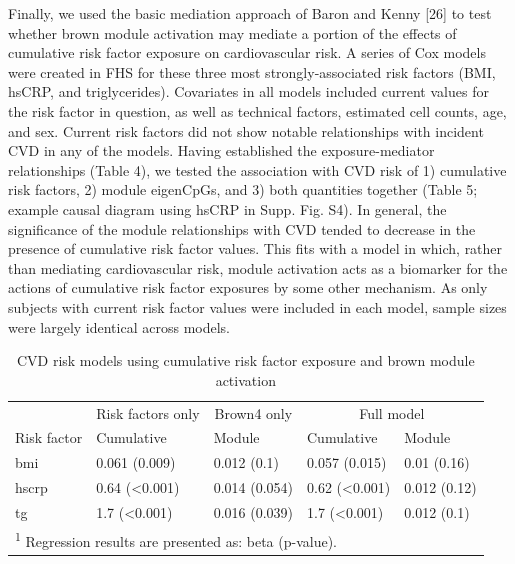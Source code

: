 \documentclass[]{article}
\theoremstyle{definition}
\theoremstyle{definition}
\theoremstyle{definition}
\theoremstyle{remark}
\begin{document}
Finally, we used the basic mediation approach of Baron and Kenny
{[}26{]} to test whether brown module activation may mediate a portion
of the effects of cumulative risk factor exposure on cardiovascular
risk. A series of Cox models were created in FHS for these three most
strongly-associated risk factors (BMI, hsCRP, and triglycerides).
Covariates in all models included current values for the risk factor in
question, as well as technical factors, estimated cell counts, age, and
sex. Current risk factors did not show notable relationships with
incident CVD in any of the models. Having established the
exposure-mediator relationships (Table 4), we tested the association
with CVD risk of 1) cumulative risk factors, 2) module eigenCpGs, and 3)
both quantities together (Table 5; example causal diagram using hsCRP in
Supp. Fig. S4). In general, the significance of the module relationships
with CVD tended to decrease in the presence of cumulative risk factor
values. This fits with a model in which, rather than mediating
cardiovascular risk, module activation acts as a biomarker for the
actions of cumulative risk factor exposures by some other mechanism. As
only subjects with current risk factor values were included in each
model, sample sizes were largely identical across models.

\begin{table}

\caption{\label{tab:module-mediation}CVD risk models using cumulative risk factor exposure and brown module activation}
\centering
\begin{tabular}[t]{lllll}
\toprule
\multicolumn{1}{c}{} & \multicolumn{1}{c}{Risk factors only} & \multicolumn{1}{c}{Brown4 only} & \multicolumn{2}{c}{Full model} \\
\cmidrule(l{2pt}r{2pt}){2-2} \cmidrule(l{2pt}r{2pt}){3-3} \cmidrule(l{2pt}r{2pt}){4-5}
Risk factor & Cumulative & Module & Cumulative & Module\\
\midrule
bmi & 0.061 (0.009) & 0.012 (0.1) & 0.057 (0.015) & 0.01 (0.16)\\
hscrp & 0.64 (<0.001) & 0.014 (0.054) & 0.62 (<0.001) & 0.012 (0.12)\\
tg & 1.7 (<0.001) & 0.016 (0.039) & 1.7 (<0.001) & 0.012 (0.1)\\
\bottomrule
\multicolumn{5}{l}{\textsuperscript{1} Regression results are presented as: beta (p-value).}\\
\end{tabular}
\end{table}
\end{document}
